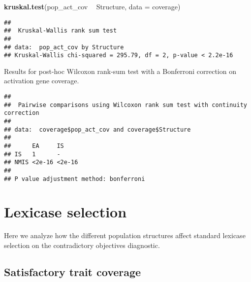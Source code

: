 \documentclass[]{book}
\newenvironment{Shaded}{\begin{snugshade}}{\end{snugshade}}
\newcommand{\DataTypeTok}[1]{\textcolor[rgb]{0.13,0.29,0.53}{#1}}
\newcommand{\KeywordTok}[1]{\textcolor[rgb]{0.13,0.29,0.53}{\textbf{#1}}}
\newcommand{\NormalTok}[1]{#1}
\newcommand{\OperatorTok}[1]{\textcolor[rgb]{0.81,0.36,0.00}{\textbf{#1}}}
\newcommand{\OtherTok}[1]{\textcolor[rgb]{0.56,0.35,0.01}{#1}}
\newcommand{\StringTok}[1]{\textcolor[rgb]{0.31,0.60,0.02}{#1}}
\begin{document}
\begin{Shaded}
\begin{Highlighting}[]
\KeywordTok{kruskal.test}\NormalTok{(pop_act_cov }\OperatorTok{~}\StringTok{ }\NormalTok{Structure, }\DataTypeTok{data =}\NormalTok{ coverage)}
\end{Highlighting}
\end{Shaded}

\begin{verbatim}
## 
##  Kruskal-Wallis rank sum test
## 
## data:  pop_act_cov by Structure
## Kruskal-Wallis chi-squared = 295.79, df = 2, p-value < 2.2e-16
\end{verbatim}

Results for post-hoc Wilcoxon rank-sum test with a Bonferroni correction on activation gene coverage.

\begin{Shaded}
\end{Shaded}

\begin{verbatim}
## 
##  Pairwise comparisons using Wilcoxon rank sum test with continuity correction 
## 
## data:  coverage$pop_act_cov and coverage$Structure 
## 
##      EA     IS    
## IS   1      -     
## NMIS <2e-16 <2e-16
## 
## P value adjustment method: bonferroni
\end{verbatim}

\hypertarget{lexicase-selection-6}{%
\section{Lexicase selection}\label{lexicase-selection-6}}

Here we analyze how the different population structures affect standard lexicase selection on the contradictory objectives diagnostic.

\hypertarget{satisfactory-trait-coverage-5}{%
\subsection{Satisfactory trait coverage}\label{satisfactory-trait-coverage-5}}
\end{document}
